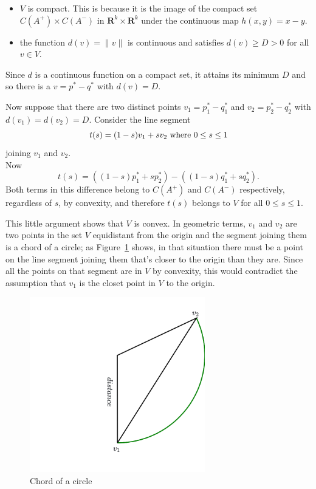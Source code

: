 \documentclass[
  11pt,
  letterpaper,
]{scrbook}
\theoremstyle{plain}
\theoremstyle{plain}
\theoremstyle{remark}
\begin{document}
\begin{itemize}
\item
  \(V\) is compact. This is because it is the image of the compact set
  \(C(A^{+})\times C(A^{-})\) in \(\mathbf{R}^{k}\times\mathbf{R}^{k}\)
  under the continuous map \(h(x,y)=x-y\).
\item
  the function \(d(v)=\|v\|\) is continuous and satisfies
  \(d(v)\ge D>0\) for all \(v\in V\).
\end{itemize}

Since \(d\) is a continuous function on a compact set, it attains its
minimum \(D\) and so there is a \(v=p^{*}-q^{*}\) with \(d(v)=D\).

Now suppose that there are two distinct points \(v_1=p_1^*-q_1^*\) and
\(v_2=p_2^*-q_2^*\) with \(d(v_1)=d(v_2)=D\). Consider the line segment
\[
t(s) = (1-s)v_1+sv_2\hbox{ where }0\le s\le 1
\] joining \(v_1\) and \(v_2\).\\
Now \[
t(s) = ((1-s)p_1^*+sp_2^*)-((1-s)q_1^*+sq_2^*).
\] Both terms in this difference belong to \(C(A^{+})\) and \(C(A^{-})\)
respectively, regardless of \(s\), by convexity, and therefore \(t(s)\)
belongs to \(V\) for all \(0\le s\le 1\).

This little argument shows that \(V\) is convex. In geometric terms,
\(v_1\) and \(v_2\) are two points in the set \(V\) equidistant from the
origin and the segment joining them is a chord of a circle; as
Figure~\ref{fig-chord} shows, in that situation there must be a point on
the line segment joining them that's closer to the origin than they are.
Since all the points on that segment are in \(V\) by convexity, this
would contradict the assumption that \(v_1\) is the closet point in
\(V\) to the origin.

\begin{figure}

{\centering \includegraphics[width=3in,height=\textheight]{chapters/img/chord2.png}

}

\caption{\label{fig-chord}Chord of a circle}

\end{figure}
\end{document}
